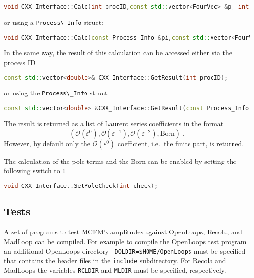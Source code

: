 \begin{lstlisting}[language={C++}]
void CXX_Interface::Calc(int procID,const std::vector<FourVec> &p, int oqcd);
\end{lstlisting}

or using a {\lstinline!Process\_Info!} struct:

\begin{lstlisting}[language={C++}]
void CXX_Interface::Calc(const Process_Info &pi,const std::vector<FourVec> &p,int oqcd);
\end{lstlisting}

In the same way, the result of this calculation can be accessed either
via the process ID

\begin{lstlisting}[language={C++}]
const std::vector<double>& CXX_Interface::GetResult(int procID);
\end{lstlisting}

or using the {\lstinline!Process\_Info!} struct:

\begin{lstlisting}[language={C++}]
const std::vector<double> &CXX_Interface::GetResult(const Process_Info &pi)
\end{lstlisting}

The result is returned as a list of Laurent series coefficients in the
format
\begin{equation*}
(\mathcal{O}(\varepsilon^0), \mathcal{O}(\varepsilon^{-1}), \mathcal{O}(\varepsilon^{-2}), \mathrm{Born})
\;.
\end{equation*}
However, by default only the \(\mathcal{O}(\varepsilon^0)\) coefficient,
i.e.~the finite part, is returned.

The calculation of the pole terms and the Born can be enabled by setting
the following switch to {\lstinline!1!}

\begin{lstlisting}[language={C++}]
void CXX_Interface::SetPoleCheck(int check);
\end{lstlisting}

\hypertarget{tests}{%
\subsection{Tests}\label{tests}}

A set of programs to test MCFM's amplitudes against
\href{https://openloops.hepforge.org}{OpenLoops},
\href{https://recola.gitlab.io/recola2/}{Recola}, and
\href{http://madgraph.phys.ucl.ac.be}{MadLoop} can be compiled. For
example to compile the OpenLoops test program an additional OpenLoops
directory {\lstinline!-DOLDIR=$HOME/OpenLoops!} must be
specified that contains the header files in the
{\lstinline!include!} subdirectory. For Recola and MadLoops
the variables {\lstinline!RCLDIR!} and
{\lstinline!MLDIR!} must be specified, respectively.


